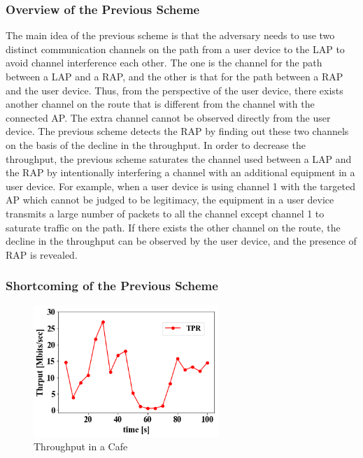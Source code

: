 \documentclass[conference]{IEEEtran}
\begin{document}
\subsubsection{Overview of the Previous Scheme}
The main idea of the previous scheme \cite{previous} is that the adversary needs to use two distinct communication channels on the path from a user device to the LAP to avoid channel interference each other.
The one is the channel for the path between a LAP and a RAP, and the other is that for the path between a RAP and the user device.
Thus, from the perspective of the user device, there exists another channel on the route that is different from the channel with the connected AP.
The extra channel cannot be observed directly from the user device.
The previous scheme detects the RAP by finding out these two channels on the basis of the decline in the throughput.
In order to decrease the throughput, the previous scheme saturates the channel used between a LAP and the RAP by intentionally interfering a channel with an additional equipment in a user device.
For example, when a user device is using channel 1 with the targeted AP which cannot be judged to be legitimacy, the equipment in a user device transmits a large number of packets to all the channel except channel 1 to saturate traffic on the path.
If there exists the other channel on the route, the decline in the throughput can be observed by the user device, and the presence of RAP is revealed.

\subsubsection{Shortcoming of the Previous Scheme}\label{sec:shortcoming}
\begin{figure}[t]
    \begin{center}
        \includegraphics[width=70mm,bb=9 9 358 434]{image/Thrput.png}
        \caption{Throughput in a Cafe}
        \label{thrput}
    \end{center}
\end{figure}
\end{document}
